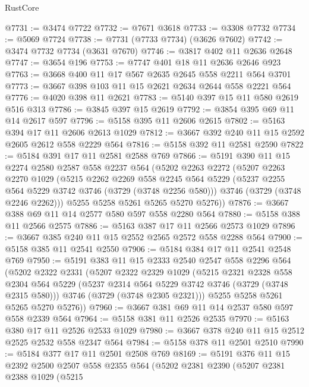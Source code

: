 \begin{lexlean}{RustCore}
\begin{coremodule}
@7731 := @3474 @7722
@7732 := @7671 @3618
@7733 := @3308 @7732
@7734 := @5069 @7724
@7738 := @7731 (@7733 @7734) (@3626 @7602)
@7742 := @3474 @7732 @7734 (@3631 @7670)
@7746 := @3817 @402 @11 @2636 @2648
@7747 := @3654 @196
@7753 := @7747 @401 @18 @11 @2636 @2646 @923
@7763 := @3668 @400 @11 @17 @567 @2635 @2645 @558 @2211 @564 @3701
@7773 := @3667 @398 @103 @11 @15 @2621 @2634 @2644 @558 @2221 @564
@7776 := @4020 @398 @11 @2621
@7783 := @5140 @397 @15 @11 @580 @2619 @516 @313
@7786 := @3845 @397 @15 @2619
@7792 := @3854 @395 @69 @11 @14 @2617 @597
@7796 := @5158 @395 @11 @2606 @2615
@7802 := @5163 @394 @17 @11 @2606 @2613 @1029
@7812 := @3667 @392 @240 @11 @15 @2592 @2605 @2612 @558 @2229 @564
@7816 := @5158 @392 @11 @2581 @2590
@7822 := @5184 @391 @17 @11 @2581 @2588 @769
@7866 := @5191
    @390
    @11
    @15
    @2274
    @2580
    @2587
    @558
    @2237
    @564
    (@5202
      @2263
      @2272
      (@5207
        @2263
        @2270
        @1029
        (@5215
          @2262
          @2269
          @558
          @2245
          @564
          @5229
          (@5237 @2255 @564 @5229 @3742 @3746 (@3729 (@3748 @2256 @580)))
          @3746
          (@3729 (@3748 @2246 @2262)))
        @5255
        @5258
        @5261
        @5265
        @5270
        @5276))
@7876 := @3667 @388 @69 @11 @14 @2577 @580 @597 @558 @2280 @564
@7880 := @5158 @388 @11 @2566 @2575
@7886 := @5163 @387 @17 @11 @2566 @2573 @1029
@7896 := @3667 @385 @240 @11 @15 @2552 @2565 @2572 @558 @2288 @564
@7900 := @5158 @385 @11 @2541 @2550
@7906 := @5184 @384 @17 @11 @2541 @2548 @769
@7950 := @5191
    @383
    @11
    @15
    @2333
    @2540
    @2547
    @558
    @2296
    @564
    (@5202
      @2322
      @2331
      (@5207
        @2322
        @2329
        @1029
        (@5215
          @2321
          @2328
          @558
          @2304
          @564
          @5229
          (@5237 @2314 @564 @5229 @3742 @3746 (@3729 (@3748 @2315 @580)))
          @3746
          (@3729 (@3748 @2305 @2321)))
        @5255
        @5258
        @5261
        @5265
        @5270
        @5276))
@7960 := @3667 @381 @69 @11 @14 @2537 @580 @597 @558 @2339 @564
@7964 := @5158 @381 @11 @2526 @2535
@7970 := @5163 @380 @17 @11 @2526 @2533 @1029
@7980 := @3667 @378 @240 @11 @15 @2512 @2525 @2532 @558 @2347 @564
@7984 := @5158 @378 @11 @2501 @2510
@7990 := @5184 @377 @17 @11 @2501 @2508 @769
@8169 := @5191
    @376
    @11
    @15
    @2392
    @2500
    @2507
    @558
    @2355
    @564
    (@5202
      @2381
      @2390
      (@5207
        @2381
        @2388
        @1029
        (@5215

\end{coremodule}
\end{lexlean}
